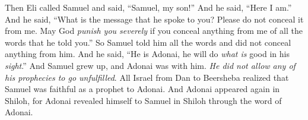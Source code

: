 \begin{biblechapter}
\verse Then Eli called Samuel and said, “Samuel, my son!” And he said, “Here I am.”
\verse And he said, “What is the message that he spoke to you? Please do not conceal it from me. May God \textit{punish you severely} if you conceal anything from me of all the words that he told you.”
\verse So Samuel told him all the words and did not conceal anything from him. And he said, “He is Adonai, he will do \textit{what is} good in his \textit{sight}.”
\verse And Samuel grew up, and Adonai was with him. \textit{He did not allow any of his prophecies to go unfulfilled}.
\verse All Israel from Dan to Beersheba realized that Samuel was faithful as a prophet to Adonai.
\verse And Adonai appeared again in Shiloh, for Adonai revealed himself to Samuel in Shiloh through the word of Adonai.
\end{biblechapter}

